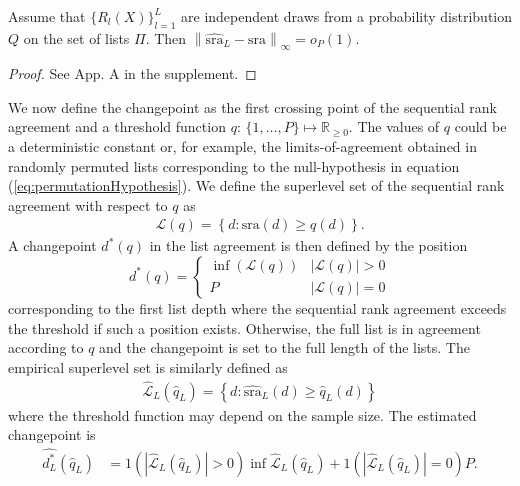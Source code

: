 \documentclass[oupdraft]{bio}
\begin{document}
\begin{theorem}
  Assume that $\{R_l(X)\}_{l=1}^L$ are independent draws from a
  probability distribution $Q$ on the set of lists $\Pi$. Then
  $\left\|\widehat{\textrm{sra}}_L - \textrm{sra}\right\|_\infty =
  o_P(1)$.
\label{thm:consistency}
\begin{proof}
See App. A in the supplement.%
\end{proof}
\end{theorem}

We now define the changepoint as the first crossing point of the
sequential rank agreement and a threshold function
$q\colon\,\{1,\ldots,P\} \mapsto \mathbb{R}_{\geq 0}$. The values of
$q$ could be a deterministic constant or, %
for example, the limits-of-agreement obtained in randomly permuted
lists corresponding to the null-hypothesis in equation
(\ref{eq:permutationHypothesis}). We define the superlevel set of the
sequential rank agreement with respect to $q$ as
\begin{align}
  \mathcal{L}(q) = \left\{d : \textrm{sra}(d) \geq q(d)\right\}.
\end{align}
A changepoint $d^\ast(q)$ in the list agreement is then defined by the position
\begin{equation}
  d^\ast(q) =
  \begin{cases}
    \inf(\mathcal{L}(q)) & |\mathcal{L}(q)| > 0\\
  P & |\mathcal{L}(q)| = 0
  \end{cases}
\end{equation}
corresponding to the first list depth where the sequential rank
agreement exceeds the threshold if such a position exists. Otherwise,
the full list is in agreement according to $q$ and the changepoint is
set to the full length of the lists. The empirical superlevel set is
similarly defined as
\begin{align}
 \widehat{\mathcal{L}}_L(\widehat{q}_L) = \left\{d : \widehat{\textrm{sra}}_L(d) \geq \widehat{q}_L(d)\right\}
\end{align}
where the threshold function may depend on the sample size.
The estimated changepoint is%
\begin{align}
  \widehat{d^\ast_L}(\widehat{q}_L) &= 1(|\widehat{\mathcal{L}}_L(\widehat{q}_L)| > 0)\inf \widehat{\mathcal{L}}_L(\widehat{q}_L) + 1(|\widehat{\mathcal{L}}_L(\widehat{q}_L)| = 0)P.
\end{align}
\end{document}
